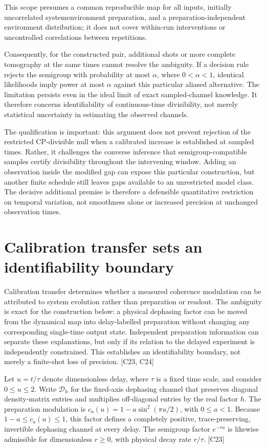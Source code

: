 \documentclass[11pt]{article}
\begin{document}
This scope presumes a common reproducible map for all inputs, initially uncorrelated system\textendash{}environment preparation, and a preparation-independent environment distribution; it does not cover within-run interventions or uncontrolled correlations between repetitions.

Consequently, for the constructed pair, additional shots or more complete tomography at the same times cannot resolve the ambiguity. If a decision rule rejects the semigroup with probability at most $\alpha$, where $0<\alpha<1$, identical likelihoods imply power at most $\alpha$ against this particular aliased alternative. The limitation persists even in the ideal limit of exact sampled-channel knowledge. It therefore concerns identifiability of continuous-time divisibility, not merely statistical uncertainty in estimating the observed channels.

The qualification is important: this argument does not prevent rejection of the restricted CP-divisible null when a calibrated increase is established at sampled times. Rather, it challenges the converse inference that semigroup-compatible samples certify divisibility throughout the intervening window. Adding an observation inside the modified gap can expose this particular construction, but another finite schedule still leaves gaps available to an unrestricted model class. The decisive additional premise is therefore a defensible quantitative restriction on temporal variation, not smoothness alone or increased precision at unchanged observation times.

\section{Calibration transfer sets an identifiability boundary}
Calibration transfer determines whether a measured coherence modulation can be attributed to system evolution rather than preparation or readout. The ambiguity is exact for the construction below: a physical dephasing factor can be moved from the dynamical map into delay-labelled preparation without changing any corresponding single-time output state. Independent preparation information can separate these explanations, but only if its relation to the delayed experiment is independently constrained. This establishes an identifiability boundary, not merely a finite-shot loss of precision. [C23, C24]

Let $u=t/\tau$ denote dimensionless delay, where $\tau$ is a fixed time scale, and consider $0\leq u\leq2$. Write $\mathcal D_h$ for the fixed-axis dephasing channel that preserves diagonal density-matrix entries and multiplies off-diagonal entries by the real factor $h$. The preparation modulation is $c_a(u)=1-a\sin^2(\pi u/2)$, with $0\leq a<1$. Because $1-a\leq c_a(u)\leq1$, this factor defines a completely positive, trace-preserving, invertible dephasing channel at every delay. The semigroup factor $e^{-ru}$ is likewise admissible for dimensionless $r\geq0$, with physical decay rate $r/\tau$. [C23]
\end{document}
